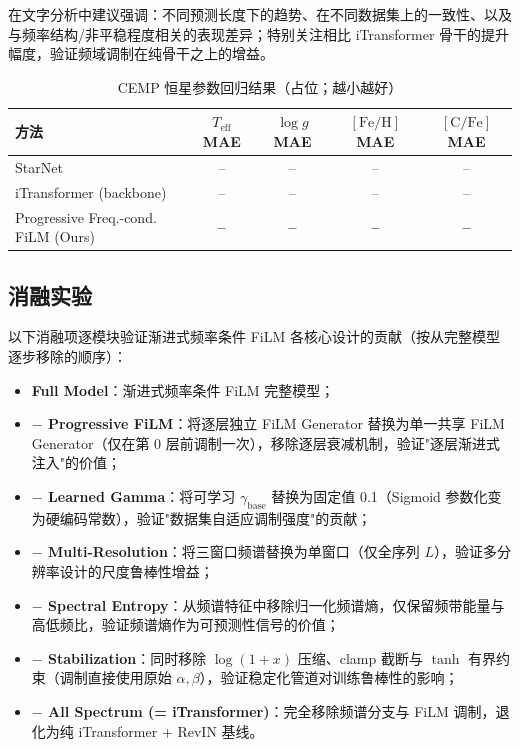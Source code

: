 在文字分析中建议强调：不同预测长度下的趋势、在不同数据集上的一致性、以及与频率结构/非平稳程度相关的表现差异；特别关注相比 iTransformer 骨干的提升幅度，验证频域调制在纯骨干之上的增益。

\begin{table}[t]
  \centering
  \caption{CEMP 恒星参数回归结果（占位；越小越好）}
  \label{tab:cemp_results}
  \begin{tabular}{lcccc}
    \toprule
    方法 & \(T_{\mathrm{eff}}\) MAE & \(\log g\) MAE & \([\mathrm{Fe/H}]\) MAE & \([\mathrm{C/Fe}]\) MAE \\
    \midrule
    StarNet~\cite{starnet} & -- & -- & -- & -- \\
    iTransformer (backbone) & -- & -- & -- & -- \\
    Progressive Freq.-cond. FiLM (Ours) & \textbf{--} & \textbf{--} & \textbf{--} & \textbf{--} \\
    \bottomrule
  \end{tabular}
\end{table}

\subsection{消融实验}
以下消融项逐模块验证渐进式频率条件 FiLM 各核心设计的贡献（按从完整模型逐步移除的顺序）：

\begin{itemize}
  \item \textbf{Full Model}：渐进式频率条件 FiLM 完整模型；
  \item \textbf{$-$ Progressive FiLM}：将逐层独立 FiLM Generator 替换为单一共享 FiLM Generator（仅在第 0 层前调制一次），移除逐层衰减机制，验证"逐层渐进式注入"的价值；
  \item \textbf{$-$ Learned Gamma}：将可学习 \(\gamma_{\text{base}}\) 替换为固定值 0.1（Sigmoid 参数化变为硬编码常数），验证"数据集自适应调制强度"的贡献；
  \item \textbf{$-$ Multi-Resolution}：将三窗口频谱替换为单窗口（仅全序列 \(L\)），验证多分辨率设计的尺度鲁棒性增益；
  \item \textbf{$-$ Spectral Entropy}：从频谱特征中移除归一化频谱熵，仅保留频带能量与高低频比，验证频谱熵作为可预测性信号的价值；
  \item \textbf{$-$ Stabilization}：同时移除 \(\log(1+x)\) 压缩、clamp 截断与 \(\tanh\) 有界约束（调制直接使用原始 \(\alpha, \beta\)），验证稳定化管道对训练鲁棒性的影响；
  \item \textbf{$-$ All Spectrum (= iTransformer)}：完全移除频谱分支与 FiLM 调制，退化为纯 iTransformer + RevIN 基线。
\end{itemize}


